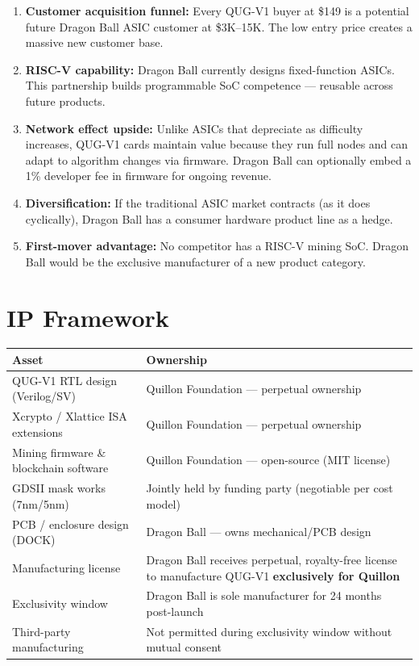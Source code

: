 \documentclass[11pt,a4paper]{article}
\begin{document}
\begin{enumerate}[leftmargin=1.5em]
    \item \textbf{Customer acquisition funnel:} Every QUG-V1 buyer at \$149 is a potential future Dragon Ball ASIC customer at \$3K--15K. The low entry price creates a massive new customer base.

    \item \textbf{RISC-V capability:} Dragon Ball currently designs fixed-function ASICs. This partnership builds programmable SoC competence --- reusable across future products.

    \item \textbf{Network effect upside:} Unlike ASICs that depreciate as difficulty increases, QUG-V1 cards maintain value because they run full nodes and can adapt to algorithm changes via firmware. Dragon Ball can optionally embed a 1\% developer fee in firmware for ongoing revenue.

    \item \textbf{Diversification:} If the traditional ASIC market contracts (as it does cyclically), Dragon Ball has a consumer hardware product line as a hedge.

    \item \textbf{First-mover advantage:} No competitor has a RISC-V mining SoC. Dragon Ball would be the exclusive manufacturer of a new product category.
\end{enumerate}

\section{IP Framework}

\begin{center}
\begin{tabular}{@{}lp{10cm}@{}}
\toprule
\textbf{Asset} & \textbf{Ownership} \\
\midrule
QUG-V1 RTL design (Verilog/SV) & Quillon Foundation --- perpetual ownership \\
Xcrypto / Xlattice ISA extensions & Quillon Foundation --- perpetual ownership \\
Mining firmware \& blockchain software & Quillon Foundation --- open-source (MIT license) \\
GDSII mask works (7nm/5nm) & Jointly held by funding party (negotiable per cost model) \\
PCB / enclosure design (DOCK) & Dragon Ball --- owns mechanical/PCB design \\
Manufacturing license & Dragon Ball receives perpetual, royalty-free license to manufacture QUG-V1 \textbf{exclusively for Quillon} \\
Exclusivity window & Dragon Ball is sole manufacturer for 24 months post-launch \\
Third-party manufacturing & Not permitted during exclusivity window without mutual consent \\
\bottomrule
\end{tabular}
\end{center}
\end{document}
